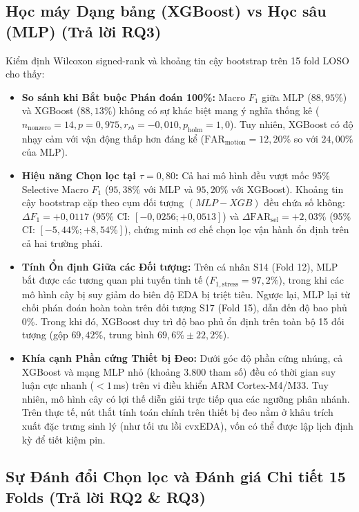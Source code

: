 \documentclass[conference]{IEEEtran}
\begin{document}
\subsection{Học máy Dạng bảng (XGBoost) vs Học sâu (MLP) (Trả lời RQ3)}
Kiểm định Wilcoxon signed-rank và khoảng tin cậy bootstrap trên 15 fold LOSO cho thấy:
\begin{itemize}
    \item \textbf{So sánh khi Bắt buộc Phán đoán 100\%:} Macro $F_1$ giữa MLP ($88,95\%$) và XGBoost ($88,13\%$) không có sự khác biệt mang ý nghĩa thống kê ($n_{\text{nonzero}} = 14, p = 0,975, r_{rb} = -0,010, p_{\text{holm}} = 1,0$). Tuy nhiên, XGBoost có độ nhạy cảm với vận động thấp hơn đáng kể ($\text{FAR}_{\text{motion}} = 12,20\%$ so với $24,00\%$ của MLP).
    \item \textbf{Hiệu năng Chọn lọc tại $\tau = 0,80$:} Cả hai mô hình đều vượt mốc 95\% Selective Macro $F_1$ ($95,38\%$ với MLP và $95,20\%$ với XGBoost). Khoảng tin cậy bootstrap cặp theo cụm đối tượng $(MLP - XGB)$ đều chứa số không: $\Delta F_1 = +0,0117$ (95\% CI: $[-0,0256; +0,0513]$) và $\Delta \text{FAR}_{\text{sel}} = +2,03\%$ (95\% CI: $[-5,44\%; +8,54\%]$), chứng minh cơ chế chọn lọc vận hành ổn định trên cả hai trường phái.
    \item \textbf{Tính Ổn định Giữa các Đối tượng:} Trên cá nhân S14 (Fold 12), MLP bắt được các tương quan phi tuyến tinh tế ($F_{1,\text{stress}} = 97,2\%$), trong khi các mô hình cây bị suy giảm do biên độ EDA bị triệt tiêu. Ngược lại, MLP lại từ chối phán đoán hoàn toàn trên đối tượng S17 (Fold 15), dẫn đến độ bao phủ 0\%. Trong khi đó, XGBoost duy trì độ bao phủ ổn định trên toàn bộ 15 đối tượng (gộp $69,42\%$, trung bình $69,6\% \pm 22,2\%$).
    \item \textbf{Khía cạnh Phần cứng Thiết bị Đeo:} Dưới góc độ phần cứng nhúng, cả XGBoost và mạng MLP nhỏ (khoảng 3.800 tham số) đều có thời gian suy luận cực nhanh ($< 1$\,ms) trên vi điều khiển ARM Cortex-M4/M33. Tuy nhiên, mô hình cây có lợi thế diễn giải trực tiếp qua các ngưỡng phân nhánh. Trên thực tế, nút thắt tính toán chính trên thiết bị đeo nằm ở khâu trích xuất đặc trưng sinh lý (như tối ưu lồi cvxEDA), vốn có thể được lập lịch định kỳ để tiết kiệm pin.
\end{itemize}

\subsection{Sự Đánh đổi Chọn lọc và Đánh giá Chi tiết 15 Folds (Trả lời RQ2 \& RQ3)}
\end{document}
